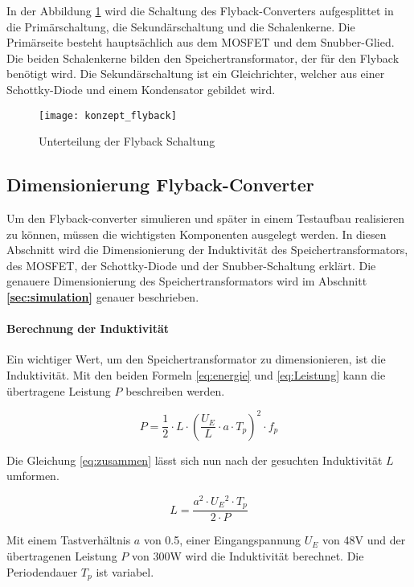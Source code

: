 In der Abbildung \ref{fig:konzept_flyback} wird die Schaltung des Flyback-Converters aufgesplittet in die Primärschaltung, die Sekundärschaltung und die Schalenkerne. Die Primärseite besteht hauptsächlich aus dem MOSFET und dem Snubber-Glied. Die beiden Schalenkerne bilden den Speichertransformator, der für den Flyback benötigt wird. Die Sekundärschaltung ist ein Gleichrichter, welcher aus einer Schottky-Diode und einem Kondensator gebildet wird.
\begin{figure}[h]
	\centering
	\texttt{[image: konzept\_flyback]}
	\caption{Unterteilung der Flyback Schaltung}\label{fig:konzept_flyback}
\end{figure}


\subsection{Dimensionierung Flyback-Converter}

Um den Flyback-converter simulieren und später in einem Testaufbau realisieren zu können, müssen die wichtigsten Komponenten ausgelegt werden. In diesen Abschnitt wird die Dimensionierung der Induktivität des Speichertransformators, des MOSFET, der Schottky-Diode und der Snubber-Schaltung erklärt. Die genauere Dimensionierung des Speichertransformators wird im Abschnitt  \textbf{\ref{sec:simulation} } genauer beschrieben.

\paragraph{Berechnung der Induktivität}
Ein wichtiger Wert, um den Speichertransformator zu dimensionieren, ist die Induktivität. Mit den beiden Formeln \ref{eq:energie} und \ref{eq:Leistung} kann die übertragene Leistung $ P $ beschreiben werden. \cite{lea}

\begin{equation}\label{eq:zusammen}
P = \frac{1}{2} \cdot L \cdot \left (\frac{U_{E}}{L}\cdot a \cdot T_{p}\right ) ^{2} \cdot f_{p}
\end{equation}

Die Gleichung \ref{eq:zusammen} lässt sich nun nach der gesuchten Induktivität $ L $ umformen.

\begin{equation}\label{eq:induktivität}
L = \frac{a^{2}\cdot U_{E}\!^{2}\cdot T_{p}}{2 \cdot P}
\end{equation}

Mit einem Tastverhältnis $ a $ von 0.5, einer Eingangspannung $ U_{E} $ von 48V und der übertragenen Leistung $ P $ von 300W wird die Induktivität berechnet. Die Periodendauer $ T_{p} $ ist variabel.

